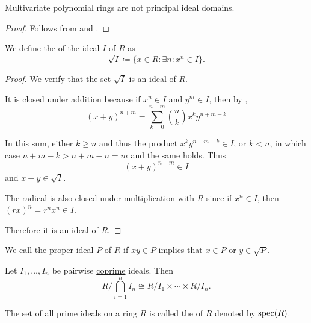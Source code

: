 \begin{corollary}\label{thm:multivariate_polynomial_rings_are_not_pid}
  Multivariate polynomial rings are not principal ideal domains.
\end{corollary}
\begin{proof}
  Follows from  and .
\end{proof}

\begin{definition}\label{def:radical_ideal}
  We define the  of the ideal \( I \) of \( R \) as
  \begin{equation*}
    \sqrt I \coloneqq \{ x \in R \colon \exists n: x^n \in I \}.
  \end{equation*}
\end{definition}
\begin{proof}
  We verify that the set \( \sqrt I \) is an ideal of \( R \).

  It is closed under addition because if \( x^n \in I \) and \( y^m \in I \), then by ,
  \begin{equation*}
    (x + y)^{n+m}
    =
    \sum_{k=0}^{n+m} \binom n k x^k y^{n+m-k}
  \end{equation*}

  In this sum, either \( k \geq n \) and thus the product \( x^k y^{n+m-k} \in I \), or \( k < n \), in which case \( n + m - k > n + m - n = m \) and the same holds. Thus
  \begin{equation*}
    (x + y)^{n+m} \in I
  \end{equation*}
  and \( x + y \in \sqrt I \).

  The radical is also closed under multiplication with \( R \) since if \( x^n \in I \), then \( (rx)^n = r^n x^n \in I \).

  Therefore it is an ideal of \( R \).
\end{proof}

\begin{definition}\label{def:primary_ring_ideal}
  We call the proper ideal \( P \) of \( R \)  if \( xy \in P \) implies that \( x \in P \) or \( y \in \sqrt P \).
\end{definition}

\begin{theorem}\label{thm:chinese_remained_theorem}
  Let \( I_1, \ldots, I_n \) be pairwise \hyperref[def:coprime_ring_ideals]{coprime} ideals. Then
  \begin{equation*}
    R / \bigcap_{i=1}^n I_n \cong R / I_1 \times \cdots \times R / I_n.
  \end{equation*}
\end{theorem}

\begin{definition}\label{def:spectrum_of_ring}
  The set of all prime ideals on a ring \( R \) is called the  of \( R \) denoted by \( \operatorname{spec}(R) \).
\end{definition}
